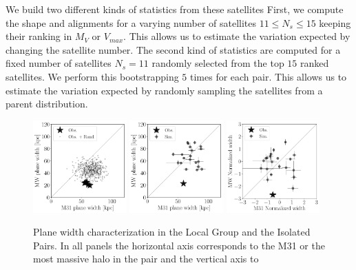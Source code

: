 \documentclass[a4paper,fleqn,usenatbib]{mnras}
\begin{document}
We build two different kinds of statistics from these satellites
First, we compute the shape and alignments for a varying number of
satellites $11\leq N_{s}\leq 15$ keeping their ranking in
$M_V$ or $V_{max}$. 
This allows us to estimate the variation expected by changing the
satellite number. 
The second kind of statistics are computed for a fixed number of
satellites $N_{s}=11$ randomly selected from the top $15$ ranked
satellites. 
We perform this bootstrapping $5$ times for each pair. 
This allows us to estimate the variation expected by randomly sampling
the satellites from a parent distribution.






\begin{figure}
\centering
\includegraphics[width=0.32\textwidth]{scatter_random_ranked_width.pdf}
\includegraphics[width=0.32\textwidth]{scatter_ranked_width.pdf}
\includegraphics[width=0.32\textwidth]{scatter_norm_width.pdf}
\caption{Plane width characterization in the Local Group and the
  Isolated Pairs. In all panels the horizontal axis corresponds to the
  M31 or the most massive halo in the pair and the vertical axis to
}
\end{figure}
\end{document}
